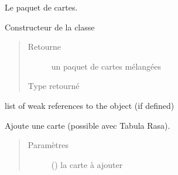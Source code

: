 \documentclass[letterpaper,10pt,french]{sphinxmanual}
\begin{document}
\begin{fulllineitems}
\label{\detokenize{doc_classe:cards.Deck}}
Le paquet de cartes.

\begin{fulllineitems}
\label{\detokenize{doc_classe:cards.Deck.__init__}}
Constructeur de la classe
\begin{quote}\begin{description}
\item[{Retourne}] \leavevmode
un paquet de cartes mélangées

\item[{Type retourné}] \leavevmode
{\hyperref[\detokenize{doc_classe:cards.Deck}]{}}

\end{description}\end{quote}

\end{fulllineitems}


\begin{fulllineitems}
\label{\detokenize{doc_classe:cards.Deck.__weakref__}}
list of weak references to the object (if defined)

\end{fulllineitems}


\begin{fulllineitems}
\label{\detokenize{doc_classe:cards.Deck.append}}
Ajoute une carte (possible avec Tabula Rasa).
\begin{quote}\begin{description}
\item[{Paramètres}] \leavevmode
{} ({\hyperref[\detokenize{doc_classe:cards.Card}]{}}) \textendash{} la carte à ajouter

\end{description}\end{quote}

\end{fulllineitems}


\end{fulllineitems}
\end{document}
